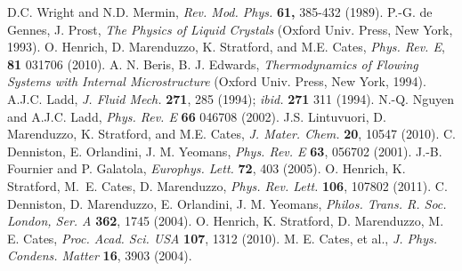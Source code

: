 \documentclass[12pt,twoside]{article}
\begin{document}

\vfill
\pagebreak


\begin{thebibliography}{99}

D.C. Wright and N.D. Mermin,
{\it Rev. Mod. Phys.} {\bf 61,} 385-432 (1989).
P.-G. de Gennes, J. Prost,
{\it The Physics of Liquid Crystals} (Oxford Univ. Press, New York, 1993).
O. Henrich, D. Marenduzzo, K. Stratford, and M.E. Cates,
\textit{Phys. Rev. E}, \textbf{81} 031706 (2010).
A. N. Beris, B. J. Edwards, 
{\it Thermodynamics of Flowing Systems with Internal Microstructure}
(Oxford Univ. Press, New York, 1994).
A.J.C. Ladd,
\textit{J. Fluid Mech.} \textbf{271}, 285 (1994); \textit{ibid.} \textbf{271}
311 (1994).
N.-Q. Nguyen and A.J.C. Ladd,
\textit{Phys. Rev. E} \textbf{66} 046708 (2002).
J.S. Lintuvuori, D. Marenduzzo, K. Stratford, and M.E. Cates,
\textit{J. Mater. Chem.} \textbf{20}, 10547 (2010).
C. Denniston, E. Orlandini, J. M. Yeomans, 
\textit{Phys. Rev. E} \textbf{63}, 056702 (2001).
J.-B. Fournier and P. Galatola,
\textit{Europhys. Lett.} \textbf{72}, 403 (2005).
O. Henrich, K. Stratford, M.~E. Cates, D. Marenduzzo,
{\it Phys. Rev. Lett.} {\bf 106}, 107802 (2011).
C. Denniston, D. Marenduzzo, E. Orlandini, J. M.  Yeomans, 
\textit{Philos. Trans. R. Soc. London, Ser. A} \textbf{362}, 1745 (2004).
O. Henrich, K. Stratford, D. Marenduzzo, M. E. Cates, 
\textit{Proc. Acad. Sci. USA} \textbf{107}, 1312 (2010).
 M. E. Cates,  et al., 
\textit{J. Phys. Condens. Matter} \textbf{16},  3903 (2004). 


\end{thebibliography}
\end{document}
